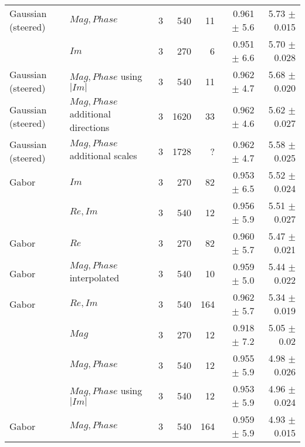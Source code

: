 \begin{tabularx}{\linewidth}{p{3cm} p{3cm} r r r r r}
Gaussian (steered)& $Mag, Phase$    & 3 &    540    & 11     & 0.961 $\pm$ 5.6  & 5.73 $\pm$ 0.015 \\

\dtcwt{}& $Im$                      & 3 &    270    &  6     & 0.951 $\pm$ 6.6  & 5.70 $\pm$ 0.028 \\

Gaussian (steered)& $Mag,Phase$ using $|Im|$
                                    & 3 &    540    & 11     & 0.962 $\pm$ 4.7  & 5.68 $\pm$ 0.020 \\

Gaussian (steered)& $Mag,Phase$ additional directions
                                    & 3 &   1620    & 33     & 0.962 $\pm$ 4.6  & 5.62 $\pm$ 0.027 \\

Gaussian (steered)& $Mag,Phase$ additional scales
                                    & 3 &   1728    &  ?     & 0.962 $\pm$ 4.7  & 5.58 $\pm$ 0.025 \\

Gabor   & $Im$                      & 3 &    270    & 82     & 0.953 $\pm$ 6.5  & 5.52 $\pm$ 0.024 \\

\dtcwt{}& $Re,Im$                   & 3 &    540    & 12     & 0.956 $\pm$ 5.9  & 5.51 $\pm$ 0.027 \\

Gabor   & $Re$                      & 3 &    270    & 82     & 0.960 $\pm$ 5.7  & 5.47 $\pm$ 0.021 \\

Gabor   & $Mag, Phase$ interpolated & 3 &    540    & 10     & 0.959 $\pm$ 5.0  & 5.44 $\pm$ 0.022 \\

Gabor   & $Re,Im$                   & 3 &    540    &164     & 0.962 $\pm$ 5.7  & 5.34 $\pm$ 0.019 \\

\dtcwt{}& $Mag$                     & 3 &    270    & 12     & 0.918 $\pm$ 7.2  & 5.05 $\pm$  0.02 \\

\dtcwt{}& $Mag,Phase$               & 3 &    540    & 12     & 0.955 $\pm$ 5.9  & 4.98 $\pm$  0.026 \\

\dtcwt{}& $Mag,Phase$ using $|Im|$  & 3 &    540    & 12     & 0.953 $\pm$ 5.9  & 4.96 $\pm$  0.024 \\

Gabor   & $Mag,Phase$               & 3 &    540    &164     & 0.959 $\pm$ 5.9  & 4.93 $\pm$  0.015 \\


\end{tabularx}
